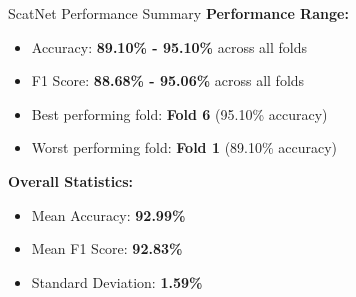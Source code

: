 \documentclass[aspectratio=169,8pt]{beamer}  %
\begin{document}
\begin{frame}{ScatNet Performance Summary}
\textbf{Performance Range:}
\begin{itemize}
\item Accuracy: \textbf{89.10\% - 95.10\%} across all folds
\item F1 Score: \textbf{88.68\% - 95.06\%} across all folds
\item Best performing fold: \textbf{Fold 6} (95.10\% accuracy)
\item Worst performing fold: \textbf{Fold 1} (89.10\% accuracy)
\end{itemize}

\textbf{Overall Statistics:}
\begin{itemize}
\item Mean Accuracy: \textbf{92.99\%}
\item Mean F1 Score: \textbf{92.83\%}
\item Standard Deviation: \textbf{1.59\%}
\end{itemize}
\end{frame}
\end{document}
